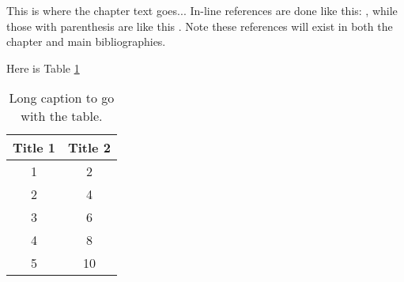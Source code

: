 \documentclass[../main.tex]{subfiles}
\begin{document}
\begin{refsegment}

This is where the chapter text goes... In-line references are done like this: \citet{Horvath2011}, while those with parenthesis are like this \citep{Horvath2011}. Note these references will exist in both the chapter and main bibliographies.

Here is Table \ref{ch2:tab:table1}

\begin{table}[h]

    \caption[Short caption for the List of Tables]{Long caption to go with the table.}

    \label{ch2:tab:table1}

    \begin{tabular}{c c}

        \hline

         Title 1 & Title 2  \\

         \hline

         1       & 2        \\
         2       & 4        \\
         3       & 6        \\
         4       & 8        \\
         5       & 10       \\

         \hline


    \end{tabular}

\end{table}

\printbibliography[segment=\the\value{refsegment}]
\end{refsegment}
\end{document}
